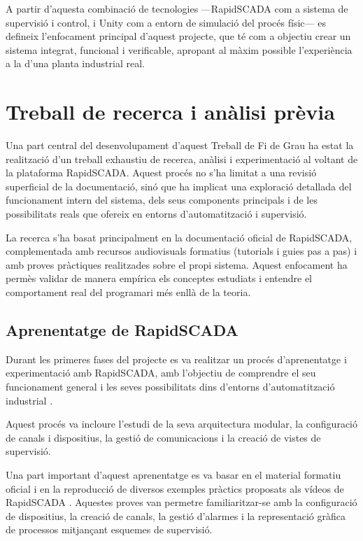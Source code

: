 \documentclass[12pt,a4paper]{report}
\begin{document}
A partir d'aquesta combinació de tecnologies —RapidSCADA com a sistema de supervisió i control, i Unity com a entorn de simulació del procés físic— es defineix l'enfocament principal d'aquest projecte, que té com a objectiu crear un sistema integrat, funcional i verificable, apropant al màxim possible l'experiència a la d'una planta industrial real.

\section{Treball de recerca i anàlisi prèvia}
\label{sec:rapidscada_research}

Una part central del desenvolupament d'aquest Treball de Fi de Grau ha estat la realització d'un treball exhaustiu de recerca, anàlisi i experimentació al voltant de la plataforma RapidSCADA. Aquest procés no s'ha limitat a una revisió superficial de la documentació, sinó que ha implicat una exploració detallada del funcionament intern del sistema, dels seus components principals i de les possibilitats reals que ofereix en entorns d'automatització i supervisió.

La recerca s'ha basat principalment en la documentació oficial de RapidSCADA, complementada amb recursos audiovisuals formatius (tutorials i guies pas a pas) i amb proves pràctiques realitzades sobre el propi sistema. Aquest enfocament ha permès validar de manera empírica els conceptes estudiats i entendre el comportament real del programari més enllà de la teoria.

\subsection{Aprenentatge de RapidSCADA}

Durant les primeres fases del projecte es va realitzar un procés d'aprenentatge i experimentació amb RapidSCADA, amb l'objectiu de comprendre el seu funcionament general i les seves possibilitats dins d'entorns d'automatització industrial \cite{RapidScada,rapidscada_intro}.

Aquest procés va incloure l'estudi de la seva arquitectura modular, la configuració de canals i dispositius, la gestió de comunicacions i la creació de vistes de supervisió.

Una part important d'aquest aprenentatge es va basar en el material formatiu oficial i en la reproducció de diversos exemples pràctics proposats als vídeos de RapidSCADA \cite{RapidScadaVideos}. Aquestes proves van permetre familiaritzar-se amb la configuració de dispositius, la creació de canals, la gestió d'alarmes i la representació gràfica de processos mitjançant esquemes de supervisió.
\end{document}

